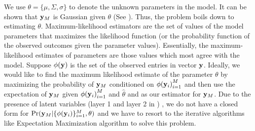 \begin{comment}
\vspace{-0.35em}
\begin{algorithm}[h]
\caption{\SYSTEMLEO{} algorithm for power estimation}
\begin{algorithmic}[1]
\REQUIRE M $\leftarrow$ Number of applications, n $\leftarrow$ Number of configurations. $\{\y_i\}_{i = 1}^{M}$ $\leftarrow$ Power measurements for M applications. $\Omega_i$  $\leftarrow$ Known indices in $\y_i$. $\Omega$  $\leftarrow$ $ \{\Omega_i\}_{i = 1}^{M}$, $\epsilon \leftarrow \text{Tolerance to control convergence}$.

\STATE Construct indicator matrix $L \in \R^{n x M}$ from $\Omega$. $L_i(j) = 1$ if $j \in \Omega_i$, $L_i(j) = 0$ otherwise.
\STATE Initialize $\theta = \mu, \Sigma,\sigma$ and likelihood $\hat{\textit{L}}_0, \epsilon$.
\STATE Set $\hat{\textit{L}}  = 2\hat{\textit{L}}_0 $.
\REPEAT
	\STATE Expectation step: Compute $C_i$ and $\hat{\z}_i$ using \eqref{eq:conditionals},
	\STATE Maximization step: Compute $\theta = (\mu, \Sigma, \sigma)$ using \eqref{eq:maximization},
	\STATE Calculate likelihood $\hat{\textit{L}}  = \textit{L} \left(\theta  \vert \{ \phi(y_i ) \}^M, \{ \hat{\z}_i\}^M \right)$ using Equation \eqref{eq:likelihood}.
	\STATE Set $\hat{\textit{L}}  = \hat{\textit{L}}_0  $.
\UNTIL{$\frac{\|  \hat{\textit{L}} - \hat{\textit{L}}_0  \|}{\hat{\textit{L}}_0 } > \epsilon$}
\STATE $ \hat{\y}_M = \hat{\z}_M$
\RETURN $ \hat{\y}_M$.
\end{algorithmic}
\label{alg:LEO}
\end{algorithm}
\end{comment}
We use $\theta = \{\mu, \Sigma, \sigma\}$ to denote the unknown
parameters in the model. It can be shown that $\mathbf{y}_M$ is Gaussian given
$\theta$ (See \cite{yu2005learning}). %
 Thus, the problem boils down to estimating $\theta$.  Maximum-likelihood
estimators are the set of values of the model parameters that
maximizes the likelihood function (or the probability function of the
observed outcomes given the parameter values).  Essentially, the
maximum-likelihood estimates of parameters are those values which most
agree with the model. Suppose $\phi(\mathbf{y})$ is the set of the observed
entries in vector $\mathbf{y}$. Ideally, we would like to find the maximum
likelihood estimate of the parameter $\theta$ by maximizing the
probability of $\mathbf{y}_M$ conditioned on ${\phi(\mathbf{y}_i)}_{i = 1}^{M}$ and
then use the expectation of $\mathbf{y}_M$ given ${\phi(\mathbf{y}_i)}_{i = 1}^{M}$
and $\hat{\theta}$ and as our estimator for $\mathbf{y}_M$. Due to the presence of latent variables (layer 1 and layer 2 in ) , we do not have a closed form for $\Pr( \mathbf{y}_M | \{\phi(\mathbf{y}_i)\}_{i = 1}^{M}, \theta )$
and we have to resort to the iterative algorithms like Expectation
Maximization algorithm to solve this problem.


